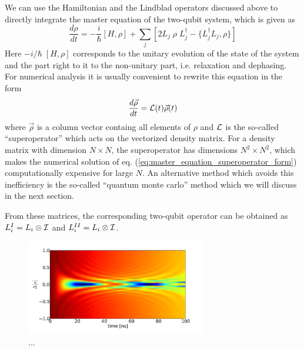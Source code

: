 We can use the Hamiltonian and the Lindblad operators discussed above to directly integrate the master equation of the two-qubit system, which is given as
%
\begin{equation}
\frac{d\rho}{dt} = -\frac{i}{\hbar}[H,\rho]+\sum\limits_j\left[2L_j \; \rho \; L_j^\dagger -\{L_j^\dagger L_j,\rho\}\right] \label{eq:master_equation_lindblad_form}
\end{equation}
%
Here $-i/\hbar \;[H,\rho]$ corresponds to the unitary evolution of the state of the system and the part right to it to the non-unitary part, i.e. relaxation and dephasing. For numerical analysis it is usually convenient to rewrite this equation in the form
%
\begin{equation}
\frac{d\vec{\rho}}{dt} = {\cal L}(t)\vec{\rho}(t) \label{eq:master_equation_superoperator_form}
\end{equation}
%
where $\vec{\rho}$ is a column vector containg all elements of $\rho$ and $\cal L$ is the so-called ``superoperator'' which acts on the vectorized density matrix. For a density matrix with dimension $N\times N$, the superoperator has dimensions $N^2 \times N^2$, which makes the numerical solution of eq. (\ref{eq:master_equation_superoperator_form}) computationally expensive for large $N$. An alternative method which avoids this inefficiency is the so-called ``quantum monte carlo'' method which we will discuss in the next section.

\smallskip

From these matrices, the corresponding two-qubit operator can be obtained as $L^I_i = L_i\otimes {\cal I}$ and $L^{II}_i = L_i\otimes {\cal I}$.


\begin{figure}
	\centering
	\includegraphics[width=0.7\textwidth]{"./material/figures/appendix/modeling/master equation/swap_01_10_m1010"}
	\caption[...]{...}
	\label{fig:master_equation_simulation_swap_01_10_10}
\end{figure}

